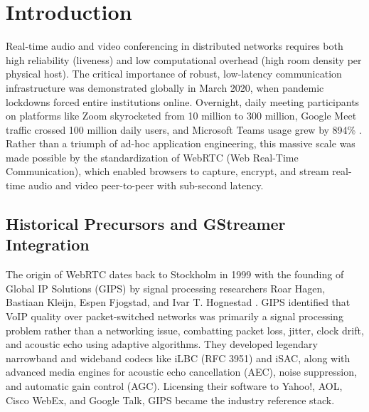 \documentclass{article}
\begin{document}
\newpage
\section{Introduction}

Real-time audio and video conferencing in distributed networks requires both high reliability (liveness)
and low computational overhead (high room density per physical host). The critical importance of robust,
low-latency communication infrastructure was demonstrated globally in March 2020, when pandemic lockdowns
forced entire institutions online. Overnight, daily meeting participants on platforms like Zoom skyrocketed
from 10 million to 300 million, Google Meet traffic crossed 100 million daily users, and Microsoft Teams
usage grew by 894\% \cite{seanslabwebrtc}. Rather than a triumph of ad-hoc application engineering, this
massive scale was made possible by the standardization of WebRTC (Web Real-Time Communication),
which enabled browsers to capture, encrypt, and stream real-time audio and video peer-to-peer with sub-second latency.

\subsection{Historical Precursors and GStreamer Integration}

The origin of WebRTC dates back to Stockholm in 1999 with the founding of Global IP Solutions (GIPS)
by signal processing researchers Roar Hagen, Bastiaan Kleijn, Espen Fjogstad, and Ivar T. Hognestad
\cite{seanslabwebrtc}. GIPS identified that VoIP quality over packet-switched networks was primarily
a signal processing problem rather than a networking issue, combatting packet loss, jitter, clock drift,
and acoustic echo using adaptive algorithms. They developed legendary narrowband and wideband codecs
like iLBC (RFC 3951) and iSAC, along with advanced media engines for acoustic echo cancellation (AEC),
noise suppression, and automatic gain control (AGC). Licensing their software to Yahoo!, AOL, Cisco WebEx,
and Google Talk, GIPS became the industry reference stack.
\end{document}
